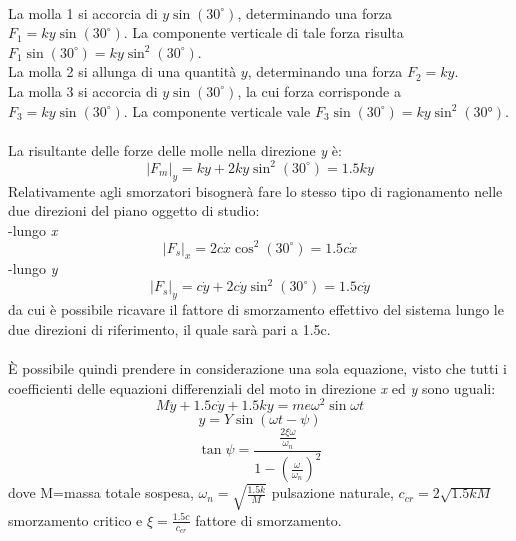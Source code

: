\\
La molla 1 si accorcia di $y\sin(30^\circ)$, determinando una forza $F_{1}=ky\sin(30^\circ)$. La componente verticale di tale forza risulta $F_{1}\sin(30^\circ)=k y\sin^2(30^\circ)$.
\\
La molla 2 si allunga di una quantità $y$, determinando una forza $F_{2}=k y$.
\\
La molla 3 si accorcia di $y\sin(30^\circ)$, la cui forza corrisponde a $F_{3}=k y\sin(30^\circ)$. La componente verticale vale $F_{3}\sin(30^\circ)=k y\sin^2(30°)$.
\\\\
La risultante delle forze delle molle nella direzione \textit {y} è:
\begin{equation}
    |F_m|_y=k y+2k y\sin^2(30^\circ)=1.5k y
\end{equation}
Relativamente agli smorzatori bisognerà fare lo stesso tipo di ragionamento nelle due direzioni del piano oggetto di studio:\\
-lungo \textit {x}
\begin{equation}
    |F_s|_x=2c\dot x\cos^2(30^\circ)=1.5c\dot x
\end{equation}
-lungo \textit {y}
\begin{equation}
    |F_s|_y=c\dot y+2c\dot y\sin^2(30^\circ)=1.5c\dot y
\end{equation}
da cui è possibile ricavare il fattore di smorzamento effettivo del sistema lungo le due direzioni di riferimento, il quale sarà pari a 1.5c.
\\\\
È possibile quindi prendere in considerazione una sola equazione, visto che tutti i coefficienti delle equazioni differenziali del moto in direzione \textit{x} ed \textit{y} sono uguali:
\begin{equation}
    M\ddot y+1.5 c \dot y+1.5k y=me\omega^2  \sin\omega t
    \label{equazionemoto}
\end{equation}
\begin{equation}
    y=Y \sin(\omega t-\psi)
    \label{y}
\end{equation}
\begin{equation}
    \tan\psi=\frac{\frac{2\xi\omega}{\omega_n}}{1-(\frac{\omega}{\omega_n})^2}
\end{equation}
dove M=massa totale sospesa, $\omega_n=\sqrt{\frac{1.5k}{M}}$ pulsazione naturale, $c_{cr}=2\sqrt{1.5kM}$ smorzamento critico e $\xi=\frac{1.5 c}{c_{cr}}$ fattore di smorzamento.
\\\\
